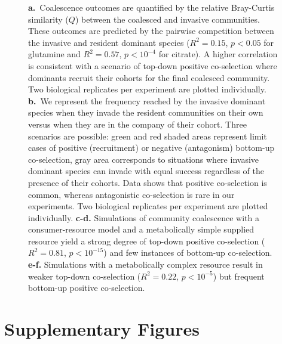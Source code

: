 \documentclass[a4paper,10pt]{article}
\begin{document}
\begin{figure}[!h]
{\textbf{a.}~Coalescence outcomes are quantified by the relative Bray-Curtis similarity
($Q$) between the coalesced and invasive communities.
These outcomes are predicted by the pairwise competition between the invasive and
resident dominant species
($R^2=0.15$, $p<0.05$ for glutamine and $R^2=0.57$, $p<10^{-4}$ for citrate).
A higher correlation is consistent with a scenario of
top-down positive co-selection where dominants recruit their cohorts for the final
coalesced community. Two biological replicates per experiment are plotted individually.
\textbf{b.}~We represent the frequency reached by
the invasive dominant species when they invade the resident communities on their own versus
when they are in the company of their cohort.
Three scenarios are possible: green and red
shaded areas represent limit cases of positive (recruitment) or negative (antagonism)
bottom-up co-selection, gray area corresponds to situations where invasive dominant
species can invade with equal success regardless of the presence of their cohorts.
Data shows that positive co-selection is common, whereas antagonistic
co-selection is rare in our experiments.
Two biological replicates per experiment are plotted individually.
\textbf{c-d.} Simulations of community coalescence with a consumer-resource model
and a metabolically simple supplied resource yield a strong degree of top-down positive
co-selection
($R^2=0.81$, $p<10^{-15}$)
and few instances of bottom-up co-selection.
\textbf{e-f.} Simulations with a metabolically complex resource result in weaker
top-down co-selection
($R^2=0.22$, $p<10^{-5}$)
but frequent bottom-up positive co-selection.}
\label{fig2}
\end{figure}

\clearpage

\section*{Supplementary Figures}

\renewcommand{\thefigure}{S\arabic{figure}}
\setcounter{figure}{0} 
\end{document}
